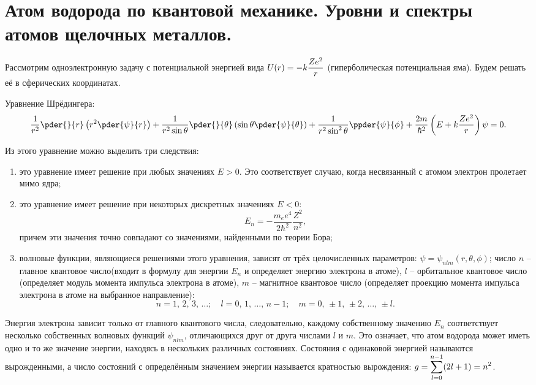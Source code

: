 \chapter{Атом водорода по квантовой механике. Уровни и спектры атомов 
щелочных металлов.}

Рассмотрим одноэлектронную задачу с потенциальной энергией вида
\( \displaystyle U(r) = -k\frac{Ze^2}{r} \) (гиперболическая потенциальная яма). Будем
решать её в сферических координатах.

Уравнение Шрёдингера:
\[
    \frac{1}{r^2}\pder{}{r}\left(r^2\pder{\psi}{r}\right) + \frac{1}{r^2
    \sin\theta}\pder{}{\theta}\left(\sin\theta\pder{\psi}{\theta}\right) +
    \frac{1}{r^2\sin^2\theta}\ppder{\psi}{\phi} + \frac{2m}{\hbar^2}\left(E +
    k\frac{Ze^2}{r}\right)\psi = 0.
\]

Из этого уравнение можно выделить три следствия:
\begin{enumerate}
    \item это уравнение имеет решение при любых значениях \( E > 0 \). Это
    соответствует случаю, когда несвязанный с атомом электрон пролетает мимо
    ядра;
    
    \item это уравнение имеет решение при некоторых дискретных значениях
    \( E < 0 \):
    \[
        E_n = -\frac{m_ee^4}{2\hbar^2}\frac{Z^2}{n^2},
    \]
    причем эти значения точно совпадают со значениями, найденными по теории
    Бора;
    
    \item волновые функции, являющиеся решениями этого уравнения, зависят от
    трёх целочисленных параметров: \( \psi = \psi_{nlm}(r, \theta, \phi) \);
    число \( n \) -- главное квантовое число(входит в формулу для энергии
    \( E_n \) и определяет энергию электрона в атоме), \( l \) -- орбитальное
    квантовое число (определяет модуль момента импульса электрона в атоме),
    \( m \) -- магнитное квантовое число (определяет проекцию момента импульса
    электрона в атоме на выбранное направление):
    \[
        n = 1,\,2,\,3,\,\ldots; \quad l = 0,\,1,\,\ldots,\,n - 1; \quad m = 0,\,
        \pm 1,\,\pm 2,\,\ldots,\,\pm l.
    \]
\end{enumerate}
    
Энергия электрона зависит только от главного квантового числа,
следовательно, каждому собственному значению \( E_n \) соответствует
несколько собственных волновых функций \( \psi_{nlm} \), отличающихся друг
от друга числами \( l \) и \( m \). Это означает, что атом водорода может
иметь одно и то же значение энергии, находясь в нескольких различных
состояниях. Состояния с одинаковой энергией называются вырожденными, а число
состояний с определённым значением энергии называется кратностью вырождения:
\( \displaystyle g = \sum_{l = 0}^{n-1} (2l + 1) = n^2 \).
    
